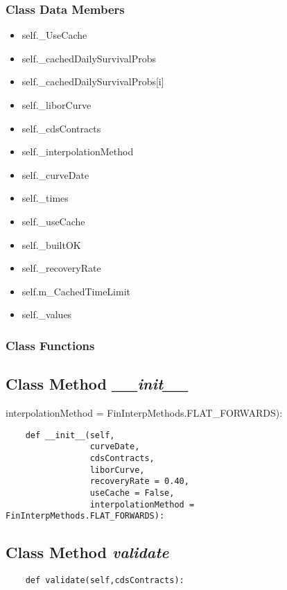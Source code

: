 \documentclass[twoside,11pt]{book}
\begin{document}
\subsubsection{Class Data Members}
\begin{itemize}
\item{self.\_UseCache}
\item{self.\_cachedDailySurvivalProbs}
\item{self.\_cachedDailySurvivalProbs[i]}
\item{self.\_liborCurve}
\item{self.\_cdsContracts}
\item{self.\_interpolationMethod}
\item{self.\_curveDate}
\item{self.\_times}
\item{self.\_useCache}
\item{self.\_builtOK}
\item{self.\_recoveryRate}
\item{self.m\_CachedTimeLimit}
\item{self.\_values}
\end{itemize}

\subsubsection{Class Functions}

\subsection{Class Method {\it \_\_init\_\_}}
interpolationMethod =  FinInterpMethods.FLAT\_FORWARDS):

\begin{lstlisting}
    def __init__(self,
                 curveDate,
                 cdsContracts,
                 liborCurve,
                 recoveryRate = 0.40,
                 useCache = False,
                 interpolationMethod =  FinInterpMethods.FLAT_FORWARDS):
\end{lstlisting}

\subsection{Class Method {\it validate}}


\begin{lstlisting}
    def validate(self,cdsContracts):
\end{lstlisting}
\end{document}
